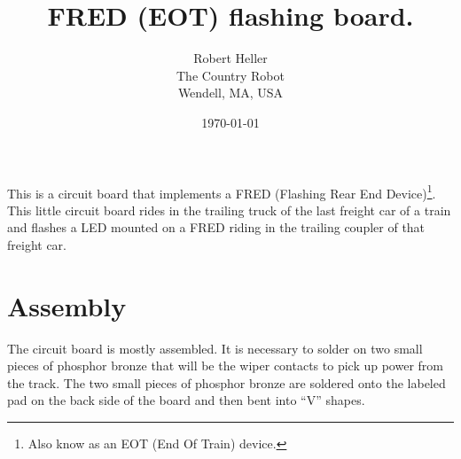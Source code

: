 \documentclass[12pt,twoside,letterpaper]{article}
\title{FRED (EOT) flashing board.}
\author{Robert Heller \\ The Country Robot \\ Wendell, MA, USA}
\date{\today}
\begin{document}
\maketitle

This is a circuit board that implements a FRED (Flashing Rear End 
Device)\footnote{Also know as an EOT (End Of Train) device.}. This little 
circuit board rides in the trailing truck of the last freight car of a train 
and flashes a LED mounted on a FRED riding in the trailing coupler of that 
freight car.

\section{Assembly}

The circuit board is mostly assembled.  It is necessary to solder on two small 
pieces of phosphor bronze that will be the wiper contacts to pick up power 
from the track. The two small pieces of phosphor bronze are soldered onto the 
labeled pad on the back side of the board and then bent into ``V'' shapes.
\end{document}
